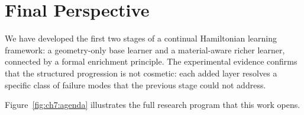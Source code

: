 \section{Final Perspective}
\label{sec:ch7:perspective}

We have developed the first two stages of a continual
Hamiltonian learning framework: a geometry-only base learner and a
material-aware richer learner, connected by a formal enrichment
principle.
The experimental evidence confirms that the structured progression
is not cosmetic: each added layer resolves a specific class of failure
modes that the previous stage could not address.

Figure~\ref{fig:ch7:agenda} illustrates the full research program
that this work opens.

